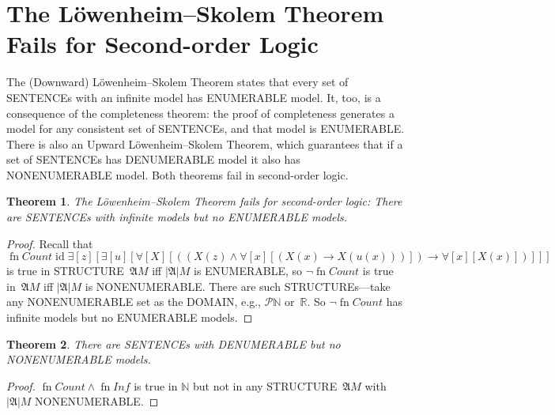 \documentclass[10pt,a4paper]{article}
\newcommand*{\olup}[1]{\MakeUppercase{#1}}
\theoremstyle{plain}
\newtheorem{thm}{Theorem}[section]
\theoremstyle{definition}
\theoremstyle{remark}
\newenvironment{explain}{}{}
\newcommand*{\olfileid}[3]{}
\newcommand*{\olsection}[1]{\section*{#1}}
\newcommand*{\ollabel}[1]{\label{#1}}
\providecommand{\lif}{\mathbin{\rightarrow}}
\providecommand{\lforall}{\mathord{\forall}}
\providecommand{\lexists}{\mathord{\exists}}
\providecommand{\Struct}{\ensuremath{\mathfrak{A}}}
\providecommand{\Domain}{\ensuremath{|\mathfrak{A}|}}
\providecommand{\Nat}{\ensuremath{\mathbb{N}}}
\providecommand{\Real}{\mathbb{R}}
\providecommand{\Pow}{\mathcal{P}}
\providecommand{\ident}{\operatorname{id}}
\providecommand{\fn}{\operatorname{fn}}
\begin{document}
\olfileid{sol}{met}{lst}

\olsection{The L\"owenheim--Skolem Theorem Fails for Second-order Logic}

\begin{explain}
The (Downward) L\"owenheim--Skolem Theorem states that every set of
\olup{sentence}s with an infinite model has \olup{enumerable} model.  It,
too, is a consequence of the completeness theorem: the proof of
completeness generates a model for any consistent set of
\olup{sentence}s, and that model is \olup{enumerable}.  There is also an
Upward L\"owenheim--Skolem Theorem, which guarantees that if a set of
\olup{sentence}s has \olup{denumerable} model it also has
\olup{nonenumerable} model.  Both theorems fail in second-order logic.
\end{explain}


\begin{thm}
\ollabel{thm:sol-no-ls} The L\"owenheim--Skolem Theorem fails for
second-order logic: There are \olup{sentence}s with infinite models but
no \olup{enumerable} models.
\end{thm}

\begin{proof}
Recall that 
\[
\fn{Count} \ident \lexists[z][\lexists[u][\lforall[X][((X(z) \land
      \lforall[x][(X(x) \lif X(u(x)))]) \lif \lforall[x][X(x)])]]]
\]
is true in \olup{structure}~$\Struct{M}$ iff $\Domain{M}$ is
\olup{enumerable}, so $\lnot\fn{Count}$ is true in~$\Struct{M}$
iff $\Domain{M}$ is \olup{nonenumerable}.  There are
such \olup{structure}s---take any \olup{nonenumerable} set as the
\olup{domain}, e.g., $\Pow{\Nat}$ or~$\Real$. So $\lnot \fn{Count}$ 
has infinite models but no \olup{enumerable} models.
\end{proof}

\begin{thm}
There are \olup{sentence}s with \olup{denumerable} but no
\olup{nonenumerable} models.
\end{thm}

\begin{proof}
$\fn{Count} \land \fn{Inf}$ is true in $\Nat$ but not in any
  \olup{structure}~$\Struct{M}$ with $\Domain{M}$ \olup{nonenumerable}.
\end{proof}



\end{document}
